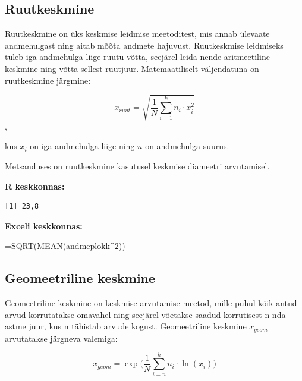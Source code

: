 \documentclass[
]{book}
\newenvironment{Shaded}{\begin{snugshade}}{\end{snugshade}}
\newcommand{\CommentTok}[1]{\textcolor[rgb]{0.56,0.35,0.01}{\textit{#1}}}
\newcommand{\DecValTok}[1]{\textcolor[rgb]{0.00,0.00,0.81}{#1}}
\newcommand{\FunctionTok}[1]{\textcolor[rgb]{0.13,0.29,0.53}{\textbf{#1}}}
\newcommand{\NormalTok}[1]{#1}
\newcommand{\SpecialCharTok}[1]{\textcolor[rgb]{0.81,0.36,0.00}{\textbf{#1}}}
\renewenvironment{Shaded} {\begin{snugshade}\footnotesize} {\end{snugshade}}
\theoremstyle{definition}
\theoremstyle{definition}
\theoremstyle{definition}
\theoremstyle{definition}
\theoremstyle{remark}
\begin{document}
\subsection{Ruutkeskmine}\label{ruutkeskmine}

Ruutkeskmine on üks keskmise leidmise meetoditest, mis annab ülevaate andmehulgast ning aitab mõõta andmete hajuvust. Ruutkeskmise leidmiseks tuleb iga andmehulga liige ruutu võtta, seejärel leida nende aritmeetiline keskmine ning võtta sellest ruutjuur. Matemaatiliselt väljendatuna on ruutkeskmine järgmine:

\[ \bar x_{ruut}=\sqrt{\frac{1}{N}\sum_{i=1}^{k}n_i \cdot x_i^2} \],

kus \(x_{i}\) on iga andmehulga liige ning \(n\) on andmehulga suurus.

Metsanduses on ruutkeskmine kasutusel keskmise diameetri arvutamisel.

\textbf{R keskkonnas:}

\begin{Shaded}
\end{Shaded}

\begin{verbatim}
[1] 23,8
\end{verbatim}

\textbf{Exceli keskkonnas:}

\begin{naideExcel}
=SQRT(MEAN(andmeplokk^2))

\end{naideExcel}

\subsection{Geomeetriline keskmine}\label{geomeetriline-keskmine}

Geomeetriline keskmine on keskmise arvutamise meetod, mille puhul kõik antud arvud korrutatakse omavahel ning seejärel võetakse saadud korrutisest n-nda astme juur, kus n tähistab arvude kogust. Geomeetriline keskmine \(\bar x_{geom}\) arvutatakse järgneva valemiga:

\[\bar x_{geom}=\exp \biggl( \frac{1}{N}\sum_{i=n}^k n_i \cdot \ln(x_i) \biggr) \]
\end{document}

